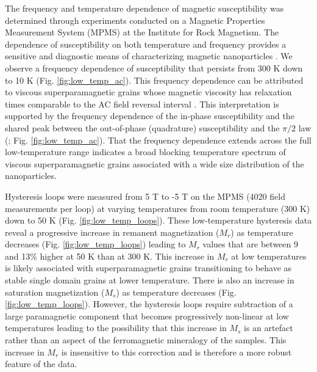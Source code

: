 \documentclass[draft]{agujournal2018}
\begin{document}
The frequency and temperature dependence of magnetic susceptibility was determined through experiments conducted on a Magnetic Properties Measurement System (MPMS) at the Institute for Rock Magnetism. The dependence of susceptibility on both temperature and frequency provides a sensitive and diagnostic means of characterizing magnetic nanoparticles \citep{Worm1999a}. We observe a frequency dependence of susceptibility that persists from 300 K down to 10 K (Fig. \ref{fig:low_temp_ac}). This frequency dependence can be attributed to viscous superparamagnetic grains whose magnetic viscosity has relaxation times comparable to the AC field reversal interval \citep{Worm1998a, Worm1999a}. This interpretation is supported by the frequency dependence of the in-phase susceptibility and the shared peak between the out-of-phase (quadrature) susceptibility and the $\pi/2$ law (\citealp{Mullins1973a}; Fig. \ref{fig:low_temp_ac}). That the frequency dependence extends across the full low-temperature range indicates a broad blocking temperature spectrum of viscous superparamagnetic grains associated with a wide size distribution of the nanoparticles. 

Hysteresis loops were measured from 5 T to -5 T on the MPMS (4020 field measurements per loop) at varying temperatures from room temperature (300 K) down to 50 K (Fig. \ref{fig:low_temp_loops}). These low-temperature hysteresis data reveal a progressive increase in remanent magnetization ($M_r$) as temperature decreases (Fig. \ref{fig:low_temp_loops}) leading to $M_r$ values that are between 9 and 13$\%$ higher at 50 K than at 300 K. This increase in $M_r$ at low temperatures is likely associated with superparamagnetic grains transitioning to behave as stable single domain grains at lower temperature. There is also an increase in saturation magnetization ($M_s$) as temperature decreases (Fig. \ref{fig:low_temp_loops}). However, the hysteresis loops require subtraction of a large paramagnetic component that becomes progressively non-linear at low temperatures leading to the possibility that this increase in $M_s$ is an artefact rather than an aspect of the ferromagnetic mineralogy of the samples. This increase in $M_r$ is insensitive to this correction and is therefore a more robust feature of the data. 
\end{document}
